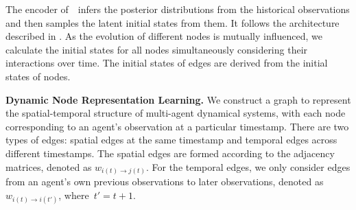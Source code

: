 The encoder of~\model~infers the posterior distributions  from the historical observations and then samples the latent initial states from them. It follows the architecture described in \cite{huang2021coupled}. As the evolution of different nodes is mutually influenced, we calculate the initial states for all nodes simultaneously considering their interactions over time. The initial states of edges are derived from the initial states of nodes.

\textbf{Dynamic Node Representation Learning.} We construct a graph to represent the spatial-temporal structure of multi-agent dynamical systems, with each node corresponding to an agent's observation at a particular timestamp.
There are two types of edges: spatial edges at the same timestamp and temporal edges across different timestamps. The spatial edges are formed according to the adjacency matrices, denoted as $w_{i(t)\rightarrow j(t)}$. For the temporal edges, we only consider edges from an agent's own previous observations to later observations, denoted as $w_{i(t)\rightarrow i(t')}$, where~$t' = t+1$.

